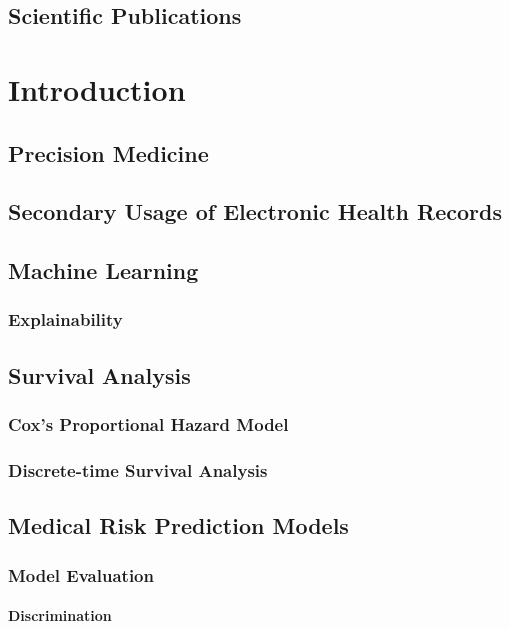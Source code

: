 \chapter{Scientific Publications}


\part{Introduction}
\chapter{Precision Medicine}
\chapter{Secondary Usage of Electronic Health Records}

\chapter{Machine Learning}
\section{Explainability}

\chapter{Survival Analysis}
\section{Cox's Proportional Hazard Model}
\section{Discrete-time Survival Analysis}

\chapter{Medical Risk Prediction Models}
\section{Model Evaluation}
\subsection{Discrimination}
